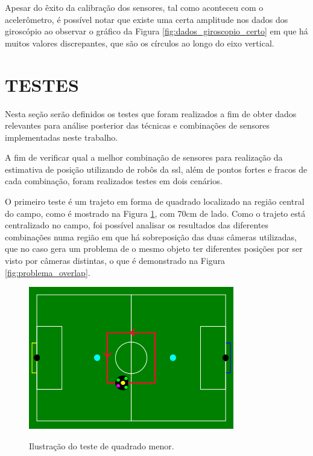 \documentclass[acronym, symbols, table, deposito]{fei}
\begin{document}
	Apesar do êxito da calibração dos sensores, tal como aconteceu com o acelerômetro, é possível notar que existe uma certa amplitude nos dados dos giroscópio ao observar o gráfico da Figura \ref{fig:dados_giroscopio_certo} em que há muitos valores discrepantes, que são os círculos ao longo do eixo vertical.
	
	\section{TESTES}\label{sec:metodologia_testes}
	
		Nesta seção serão definidos os testes que foram realizados a fim de obter dados relevantes para análise posterior das técnicas e combinações de sensores implementadas neste trabalho.
		
		A fim de verificar qual a melhor combinação de sensores para realização da estimativa de posição utilizando  de robôs da \acrshort{ssl}, além de pontos fortes e fracos de cada combinação, foram realizados testes em dois cenários.
		
		O primeiro teste é um trajeto em forma de quadrado localizado na região central do campo, como é mostrado na Figura \ref{fig:representacao_teste_quadrado_menor}, com 70cm de lado. Como o trajeto está centralizado no campo, foi possível analisar os resultados das diferentes combinações numa região em que há sobreposição das duas câmeras utilizadas, que no caso gera um problema de o mesmo objeto ter diferentes posições por ser visto por câmeras distintas, o que é demonstrado na Figura \ref{fig:problema_overlap}.
		
		\begin{figure}[!htb]
			\centering
			\caption{Ilustração do teste de quadrado menor.}
			\includegraphics[width=0.80\textwidth]{representacao_teste_quadrado_menor.png}
			\label{fig:representacao_teste_quadrado_menor}
		\end{figure}
	
\end{document}
